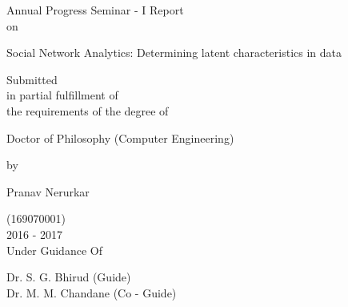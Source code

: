 \documentclass[oneside,11pt]{Classes/CUEDthesisPSnPDF}
\theoremstyle{definition}
\begin{document}

\begin{titlepage}
	\begin{center}
	
	\begin{large}
	Annual Progress Seminar - I Report\\ on\\
	\end{large}			
		 
		
		\vspace*{1\baselineskip}
		\begin{huge}
			
		Social Network Analytics: Determining latent characteristics in data\\
		\end{huge}
			
		\vspace*{1\baselineskip}
		Submitted\\
in partial fulfillment of\\
the requirements of the degree of\\
\vspace*{1\baselineskip}
		\begin{large}
		Doctor of Philosophy (Computer Engineering) \\
		\end{large}
		\vspace*{1\baselineskip}
		
		by\\
		\vspace*{1\baselineskip}
		\begin{large}
			Pranav Nerurkar\\ 
		\end{large}
		(169070001)\\
		2016 - 2017\\
		\vspace*{1\baselineskip}
		Under Guidance Of\\
		\vspace*{1\baselineskip}
		\begin{large}
Dr. S. G. Bhirud (Guide)\\
Dr. M. M. Chandane (Co - Guide)\\
\end{large}
		
		
	\end{center}



\end{titlepage}
\end{document}

